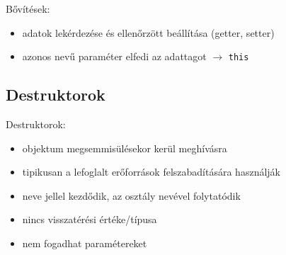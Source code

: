 \documentclass[usenames,dvipsnames,aspectratio=169]{beamer}
\begin{document}
\begin{frame}
    Bővítések:
    \begin{itemize}
        \item adatok lekérdezése és ellenőrzött beállítása (getter, setter)
        \item azonos nevű paraméter elfedi az adattagot $\to$ \texttt{this}
    \end{itemize}
    \begin{exampleblock}{}
        \scriptsize
        \vspace{-0.3cm}
        
        
        \vspace{-0.3cm}
    \end{exampleblock}
\end{frame}

\begin{frame}
    \begin{exampleblock}{}
        
    \end{exampleblock}
\end{frame}

\begin{frame}
    \begin{exampleblock}{}
        
    \end{exampleblock}
\end{frame}

\subsection{Destruktorok}

\begin{frame}
    Destruktorok:
    \begin{itemize}
        \item objektum megsemmisülésekor kerül meghívásra
        \item tipikusan a lefoglalt erőforrások felszabadítására használják
        \item neve \kiemel{\textasciitilde} jellel kezdődik, az osztály nevével folytatódik
        \item nincs visszatérési értéke/típusa
        \item nem fogadhat paramétereket
    \end{itemize}
\end{frame}
\end{document}
